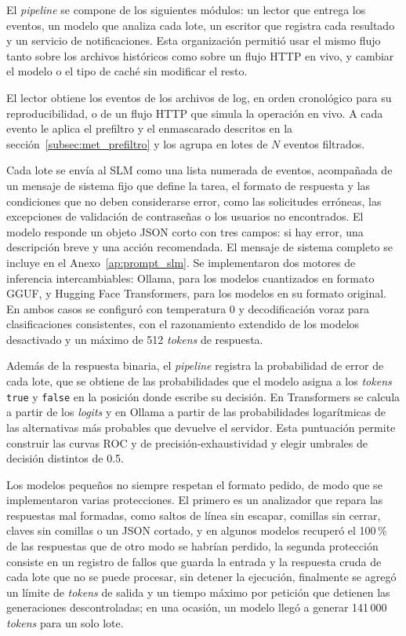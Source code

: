 El \textit{pipeline} se compone de los siguientes módulos: un lector que entrega los eventos, un modelo que analiza cada lote, un escritor que registra cada resultado y un servicio de notificaciones. Esta organización permitió usar el mismo flujo tanto sobre los archivos históricos como sobre un flujo HTTP en vivo, y cambiar el modelo o el tipo de caché sin modificar el resto.


El lector obtiene los eventos de los archivos de log, en orden cronológico para su reproducibilidad, o de un flujo HTTP que simula la operación en vivo. A cada evento le aplica el prefiltro y el enmascarado descritos en la sección~\ref{subsec:met_prefiltro} y los agrupa en lotes de $N$ eventos filtrados.


Cada lote se envía al SLM como una lista numerada de eventos, acompañada de un mensaje de sistema fijo que define la tarea, el formato de respuesta y las condiciones que no deben considerarse error, como las solicitudes erróneas, las excepciones de validación de contraseñas o los usuarios no encontrados. El modelo responde un objeto JSON corto con tres campos: si hay error, una descripción breve y una acción recomendada. El mensaje de sistema completo se incluye en el Anexo~\ref{ap:prompt_slm}. Se implementaron dos motores de inferencia intercambiables: Ollama, para los modelos cuantizados en formato GGUF, y Hugging Face Transformers, para los modelos en su formato original. En ambos casos se configuró con temperatura 0 y decodificación voraz para clasificaciones consistentes, con el razonamiento extendido de los modelos desactivado y un máximo de 512 \textit{tokens} de respuesta.


Además de la respuesta binaria, el \textit{pipeline} registra la probabilidad de error de cada lote, que se obtiene de las probabilidades que el modelo asigna a los \textit{tokens} \texttt{true} y \texttt{false} en la posición donde escribe su decisión. En Transformers se calcula a partir de los \textit{logits} y en Ollama a partir de las probabilidades logarítmicas de las alternativas más probables que devuelve el servidor. Esta puntuación permite construir las curvas ROC y de precisión-exhaustividad y elegir umbrales de decisión distintos de 0.5.


Los modelos pequeños no siempre respetan el formato pedido, de modo que se implementaron varias protecciones. El primero es un analizador que repara las respuestas mal formadas, como saltos de línea sin escapar, comillas sin cerrar, claves sin comillas o un JSON cortado, y en algunos modelos recuperó el 100\,\% de las respuestas que de otro modo se habrían perdido, la segunda protección consiste en un registro de fallos que guarda la entrada y la respuesta cruda de cada lote que no se puede procesar, sin detener la ejecución, finalmente se agregó un límite de \textit{tokens} de salida y un tiempo máximo por petición que detienen las generaciones descontroladas; en una ocasión, un modelo llegó a generar 141\,000 \textit{tokens} para un solo lote.

